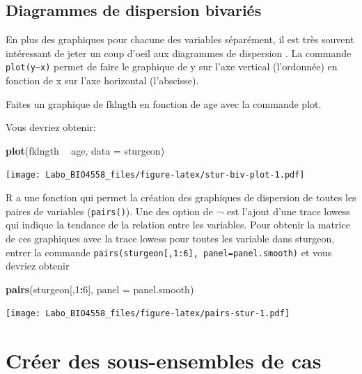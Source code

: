 \documentclass[12pt,]{book}
\makeatletter
\newenvironment{Shaded}{\begin{snugshade}}{\end{snugshade}}
\newcommand{\DataTypeTok}[1]{\textcolor[rgb]{0.27,0.27,0.27}{#1}}
\newcommand{\DecValTok}[1]{\textcolor[rgb]{0.06,0.06,0.06}{#1}}
\newcommand{\KeywordTok}[1]{\textcolor[rgb]{0.27,0.27,0.27}{\textbf{#1}}}
\newcommand{\NormalTok}[1]{#1}
\newcommand{\OperatorTok}[1]{\textcolor[rgb]{0.43,0.43,0.43}{\textbf{#1}}}
\newcommand{\StringTok}[1]{\textcolor[rgb]{0.5,0.5,0.5}{#1}}
\newenvironment{kframe}{%
\medskip{}
\setlength{\fboxsep}{.8em}
 \def\at@end@of@kframe{}%
 \ifinner\ifhmode%
  \def\at@end@of@kframe{\end{minipage}}%
  \begin{minipage}{\columnwidth}%
 \fi\fi%
 \def\FrameCommand##1{\hskip\@totalleftmargin \hskip-\fboxsep
 \colorbox{shadecolor}{##1}\hskip-\fboxsep
     \hskip-\linewidth \hskip-\@totalleftmargin \hskip\columnwidth}%
 \MakeFramed {\advance\hsize-\width
   \@totalleftmargin\z@ \linewidth\hsize
   \@setminipage}}%
 {\par\unskip\endMakeFramed%
 \at@end@of@kframe}
\newenvironment{rmdblock}[1]
  {
  \begin{itemize}
  \renewcommand{\labelitemi}{
    \raisebox{-.7\height}[0pt][0pt]{
      {\setkeys{Gin}{width=3em,keepaspectratio}\texttt{[image: images/\#1]}}
    }
  }
  \setlength{\fboxsep}{1em}
  \begin{kframe}
  \item
  }
  {
  \end{kframe}
  \end{itemize}
  }
\newenvironment{rmdcode}
  {\begin{rmdblock}{screen}}
  {\end{rmdblock}}
\makeatother
\begin{document}
\hypertarget{diagrammes-de-dispersion-bivariuxe9s}{%
\subsection{Diagrammes de dispersion bivariés}\label{diagrammes-de-dispersion-bivariuxe9s}}

En plus des graphiques pour chacune des variables séparément, il est très souvent intéressant de jeter un coup d'oeil aux diagrammes de dispersion .
La commande \texttt{plot(y\textasciitilde{}x)} permet de faire le graphique de y sur l'axe vertical (l'ordonnée) en fonction de x sur l'axe horizontal (l'abscisse).

\begin{rmdcode}
Faites un graphique de fklngth en fonction de age avec la commande plot.
\end{rmdcode}

Vous devriez obtenir:

\begin{Shaded}
\begin{Highlighting}[]
\KeywordTok{plot}\NormalTok{(fklngth }\OperatorTok{~}\StringTok{ }\NormalTok{age, }\DataTypeTok{data =}\NormalTok{ sturgeon)}
\end{Highlighting}
\end{Shaded}

\texttt{[image: Labo\_BIO4558\_files/figure-latex/stur-biv-plot-1.pdf]}

R a une fonction qui permet la création des graphiques de dispersion de toutes les paires de variables (\texttt{pairs()}).
Une des option de ¬ est l'ajout d'une trace lowess qui indique la tendance de la relation entre les variables.
Pour obtenir la matrice de ces graphiques avec la trace lowess pour toutes les variable dans sturgeon, entrer la commande \texttt{pairs(sturgeon{[},1:6{]},\ panel=panel.smooth)} et vous devriez obtenir

\begin{Shaded}
\begin{Highlighting}[]
\KeywordTok{pairs}\NormalTok{(sturgeon[,}\DecValTok{1}\OperatorTok{:}\DecValTok{6}\NormalTok{], }\DataTypeTok{panel =}\NormalTok{ panel.smooth)}
\end{Highlighting}
\end{Shaded}

\texttt{[image: Labo\_BIO4558\_files/figure-latex/pairs-stur-1.pdf]}

\hypertarget{cruxe9er-des-sous-ensembles-de-cas}{%
\section{Créer des sous-ensembles de cas}\label{cruxe9er-des-sous-ensembles-de-cas}}
\end{document}
